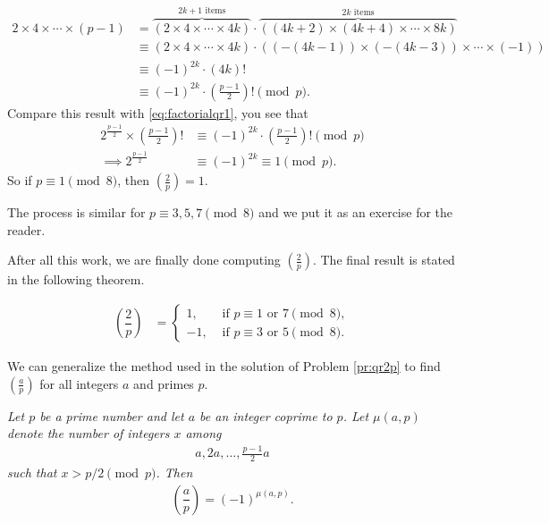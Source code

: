 \documentclass[main.tex]{subfile}
\begin{document}
\begin{solution}
			\begin{align*}
				2 \times 4 \times \cdots \times (p-1)
					&= \overbrace{\left(2 \times 4 \times \cdots \times 4k\right)}^{2k+1 \text{ items}} \cdot \overbrace{\left((4k+2) \times (4k+4) \times \cdots \times 8k\right)}^{2k \text{ items}}\\
					& \equiv \left(2 \times 4 \times \cdots \times 4k\right) \cdot \left((-(4k-1)) \times (-(4k-3)) \times \cdots \times (-1)\right) \\
					& \equiv (-1)^{2k} \cdot (4k)!\\
					& \equiv (-1)^{2k} \cdot \left(\frac{p-1}{2}\right)! \pmod p.
			\end{align*}
		Compare this result with \eqref{eq:factorialqr1}, you see that
			\begin{align*}
				2^\frac{p-1}{2} \times \left(\frac{p-1}{2}\right)!
					& \equiv (-1)^{2k} \cdot \left(\frac{p-1}{2}\right)! \pmod p\\
				\implies 2^\frac{p-1}{2}
					& \equiv (-1)^{2k} \equiv 1 \pmod p.
			\end{align*}
		So if $p \equiv 1 \pmod 8$, then $ \left(\frac{2}{p}\right)=1$.

		The process is similar for $p \equiv 3, 5, 7 \pmod 8$ and we put it as an exercise for the reader.

		After all this work, we are finally done computing $ \left(\frac{2}{p}\right)$. The final result is stated in the following theorem.

		\begin{theorem}\slshape\label{thm:2qr}
			\begin{align*}
			\left(\dfrac{2}{p}\right)
			& =
			\begin{cases}
			1,&\mbox{ if } p \equiv 1 \mbox{ or } 7\pmod 8,\\
			-1,&\mbox{ if } p \equiv 3 \mbox{ or } 5\pmod 8.
			\end{cases}
			\end{align*}
		\end{theorem}

	\end{solution}
We can generalize the method used in the solution of Problem \ref{pr:qr2p} to find $ \left(\frac{a}{p}\right)$ for all integers $a$ and primes $p$.
	\begin{theorem}\slshape\label{thm:gausscriterion}
		Let $p$ be a prime number and let $a$ be an integer coprime to $p$. Let $\mu(a,p)$ denote the number of integers $x$ among
		\begin{align*}
		a, 2a, \ldots, \frac{p-1}{2}a
		\end{align*}
		such that $\displaystyle x > p/2 \pmod p$. Then
		\begin{align*}
		\left(\dfrac{a}{p}\right) = (-1)^{\mu(a,p)}.
		\end{align*}
	\end{theorem}
\end{document}
